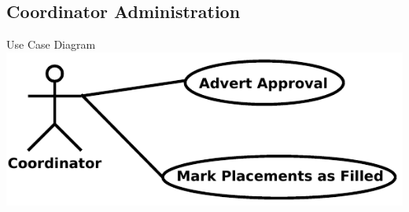 \documentclass{l3deliverable}
\begin{document}
\newpage
\subsection{Coordinator Administration}
Use Case Diagram\\
\includegraphics{CoordinatorAdministration.pdf}
\end{document}
